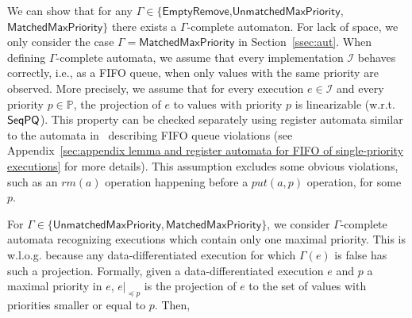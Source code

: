 We can show that for any $\Gamma\in \{\mathsf{EmptyRemove}$,$\mathsf{UnmatchedMaxPriority}$,$\mathsf{MatchedMaxPriority}\}$ there exists a $\Gamma$-complete automaton. For lack of space, we only consider the case $\Gamma=\mathsf{MatchedMaxPriority}$ in
Section~\ref{ssec:aut}.
When defining $\Gamma$-complete automata, we assume that every implementation $\mathcal{I}$ behaves correctly, i.e., as a FIFO queue, when only values with the same priority are observed. More precisely, we assume that for every execution $e\in\mathcal{I}$ and every priority $p\in\mathbb{P}$, the projection of $e$ to values with priority $p$ is linearizable (w.r.t. $\mathsf{SeqPQ}$). This property can be checked separately using register automata similar to the automata in~\cite{DBLP:conf/icalp/BouajjaniEEH15} describing FIFO queue violations (see Appendix~\ref{sec:appendix lemma and register automata for FIFO of single-priority executions} for more details). This assumption excludes some obvious violations, such as an $\textit{rm}(a)$ operation happening before a $\textit{put}(a,p)$ operation, for some $p$.

For $\Gamma\in \{\mathsf{UnmatchedMaxPriority}, \mathsf{MatchedMaxPriority}\}$, we consider $\Gamma$-complete automata recognizing executions which contain only one maximal priority. This is w.l.o.g. because any data-differentiated execution for which $\Gamma(e)$ is false has such a projection.
Formally, given a data-differentiated execution $e$ and $p$ a maximal priority in $e$, $e\vert_{\preceq p}$ is the projection of $e$ to the set of values with priorities smaller or equal to $p$. Then,

